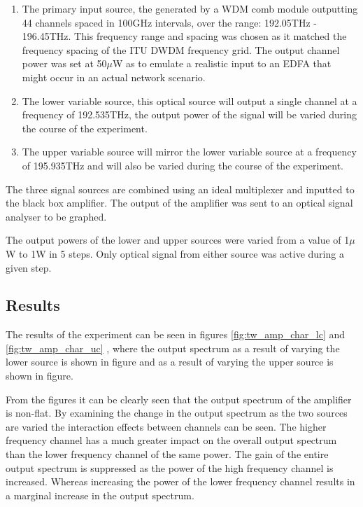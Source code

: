 \begin{enumerate}
    \item The primary input source, the generated by a WDM comb module outputting 44 channels spaced in 100GHz intervals, over the range: 192.05THz - 196.45THz. This frequency range and spacing was chosen as it matched the frequency spacing of the ITU DWDM frequency grid. The output channel power was set at 50$\mu$W as to emulate a realistic input to an EDFA that might occur in an actual network scenario. \\
    
    \item The lower variable source, this optical source will output a single channel at a frequency of 192.535THz, the output power of the signal will be varied during the course of the experiment.\\
    
    \item The upper variable source will mirror the lower variable source at a frequency of 195.935THz and will also be varied during the course of the experiment.  
\end{enumerate}


The three signal sources are combined using an ideal multiplexer and inputted to the black box amplifier. The output of the amplifier was sent to an optical signal analyser to be graphed.

The output powers of the lower and upper sources were varied from a value of 1$\mu$W to 1W in 5 steps. Only optical signal from either source was active during a given step.

\subsection{Results}


The results of the experiment can be seen in figures \ref{fig:tw_amp_char_lc} and \ref{fig:tw_amp_char_uc} , where the output spectrum as a result of varying the lower source is shown in figure and as a result of varying the upper source is shown in figure. 

From the figures it can be clearly seen that the output spectrum of the amplifier is non-flat. By examining the change in the output spectrum as the two sources are varied the interaction effects between channels can be seen. The higher frequency channel has a much greater impact on the overall output spectrum than the lower frequency channel of the same power. The gain of the entire output spectrum is suppressed as the power of the high frequency channel is increased. Whereas increasing the power of the lower frequency channel results in a marginal increase in the output spectrum. 



